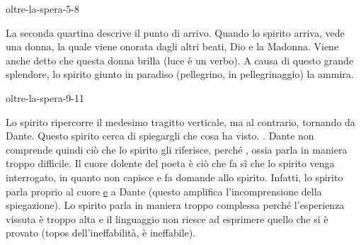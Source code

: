 \documentclass[preview]{standalone}
\begin{document}
\begin{snippet}{oltre-la-spera-5-8}

    La seconda quartina descrive il punto di arrivo.
    Quando lo spirito arriva, vede una donna, la quale viene onorata dagli altri beati, Dio e la Madonna.
    Viene anche detto che questa donna brilla (luce è un verbo).
    A causa di questo grande splendore, lo spirito giunto in paradiso (pellegrino, in pellegrinaggio) la ammira.
\end{snippet}

\begin{snippet}{oltre-la-spera-9-11}

    Lo spirito ripercorre il medesimo tragitto verticale, ma al contrario, tornando da Dante.
    Questo spirito cerca di spiegargli che cosa ha visto.
    .
    Dante non comprende quindi ciò che lo spirito gli riferisce, perché
    , ossia parla in maniera troppo difficile.
    Il cuore dolente del poeta è ciò che fa sì che lo spirito venga interrogato, 
    in quanto non capisce e fa domande allo spirito.
    Infatti, lo spirito parla proprio al cuore \underline{e} a Dante (questo amplifica l'incomprensione della spiegazione).
    Lo spirito parla in maniera troppo complessa perché l'esperienza vissuta è troppo alta 
    e il linguaggio non riesce ad esprimere quello che si è provato (topos dell'ineffabilità, è ineffabile).
\end{snippet}
\end{document}
